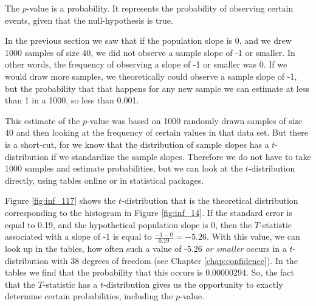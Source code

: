 \documentclass[]{book}\usepackage[]{graphicx}\usepackage[]{color}
\begin{document}
The $p$-value is a probability. It represents the probability of observing certain events, given that the null-hypothesis is true.

In the previous section we saw that if the population slope is 0, and we drew 1000 samples of size 40, we did not observe a sample slope of -1 or smaller. In other words, the frequency of observing a slope of -1 or smaller was 0. If we would draw more samples, we theoretically could observe a sample slope of -1, but the probability that that happens for any new sample we can estimate at less than 1 in a 1000, so less than 0.001.

This estimate of the $p$-value was based on 1000 randomly drawn samples of size 40 and then looking at the frequency of certain values in that data set. But there is a short-cut, for we know that the distribution of sample slopes has a $t$-distribution if we standardize the sample slopes. Therefore we do not have to take 1000 samples and estimate probabilities, but we can look at the $t$-distribution directly, using tables online or in statistical packages.

Figure \ref{fig:inf_117} shows the $t$-distribution that is the theoretical distribution corresponding to the histogram in Figure \ref{fig:inf_14}. If the standard error is equal to 0.19, and the hypothetical population slope is 0, then the $T$-statistic associated with a slope of -1 is equal to $\frac{-1-0}{0.19}=-5.26$. With this value, we can look up in the tables, how often such a value of -5.26 \textit{or smaller} occurs in a $t$-distribution with 38 degrees of freedom (see Chapter \ref{chap:confidence}). In the tables we find that the probability that this occurs is 0.00000294. So, the fact that the $T$-statistic has a $t$-distribution gives us the opportunity to exactly determine certain probabilities, including the $p$-value.
\end{document}
